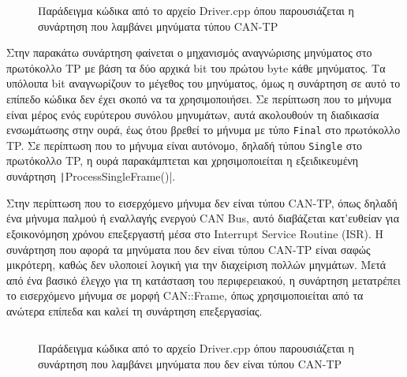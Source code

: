 \documentclass[a4paper,nobib,justified]{tufte-book}
\begin{document}
\begin{figure}
	\inputminted{c++}{code/examples/driver-tp-message-receiver.cpp}
	\label{code:driver-tp-message-receiver}
	\caption[Η συνάρτηση που λαμβάνει μηνύματα τύπου CAN-TP]{Παράδειγμα κώδικα από το αρχείο Driver.cpp όπου παρουσιάζεται η συνάρτηση που λαμβάνει μηνύματα τύπου CAN-TP}
\end{figure}

Στην παρακάτω συνάρτηση φαίνεται ο μηχανισμός αναγνώρισης μηνύματος στο πρωτόκολλο TP με βάση τα δύο αρχικά bit του πρώτου byte κάθε μηνύματος. Τα υπόλοιπα bit αναγνωρίζουν το μέγεθος του μηνύματος, όμως η συνάρτηση σε αυτό το επίπεδο κώδικα δεν έχει σκοπό να τα χρησιμοποιήσει. Σε περίπτωση που το μήνυμα είναι μέρος ενός ευρύτερου συνόλου μηνυμάτων, αυτά ακολουθούν τη διαδικασία ενσωμάτωσης στην ουρά, έως ότου βρεθεί το μήνυμα με τύπο \texttt{Final} στο πρωτόκολλο TP. Σε περίπτωση που το μήνυμα είναι αυτόνομο, δηλαδή τύπου \texttt{Single} στο πρωτόκολλο TP, η ουρά παρακάμπτεται και χρησιμοποιείται η εξειδικευμένη συνάρτηση \texttt|ProcessSingleFrame()|.

Στην περίπτωση που το εισερχόμενο μήνυμα δεν είναι τύπου CAN-TP, όπως δηλαδή ένα μήνυμα παλμού ή εναλλαγής ενεργού CAN Bus, αυτό διαβάζεται κατ'ευθείαν για εξοικονόμηση χρόνου επεξεργαστή μέσα στο Interrupt Service Routine (ISR). Η συνάρτηση που αφορά τα μηνύματα που δεν είναι τύπου CAN-TP είναι σαφώς μικρότερη, καθώς δεν υλοποιεί λογική για την διαχείριση πολλών μηνμάτων. Μετά από ένα βασικό έλεγχο για τη κατάσταση του περιφερειακού, η συνάρτηση μετατρέπει το εισερχόμενο μήνυμα σε μορφή CAN::Frame, όπως χρησιμοποιείται από τα ανώτερα επίπεδα και καλεί τη συνάρτηση επεξεργασίας.

\begin{figure}
	\inputminted{c++}{code/examples/driver-non-tp-receiver.cpp}
	\label{code:driver-non-tp-receiver}
	\caption[Η συνάρτηση που λαμβάνει μηνύματα που δεν είναι τύπου CAN-TP]{Παράδειγμα κώδικα από το αρχείο Driver.cpp όπου παρουσιάζεται η συνάρτηση που λαμβάνει μηνύματα που δεν είναι τύπου CAN-TP}
\end{figure}
\end{document}
